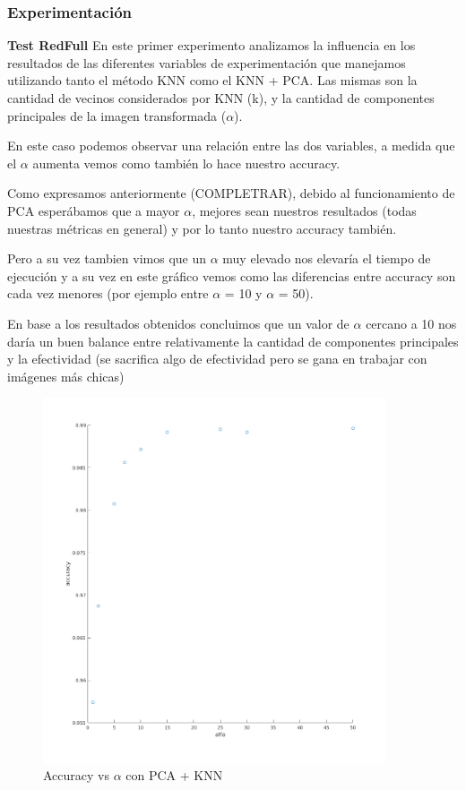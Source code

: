 \subsubsection*{Experimentación}
\textbf{Test RedFull}
En este primer experimento analizamos la influencia en los resultados de las diferentes variables de experimentación que manejamos utilizando tanto el método KNN como el KNN + PCA. Las mismas son la cantidad de vecinos considerados por KNN (k), y la cantidad de componentes principales de la imagen transformada ($\alpha$).


En este caso podemos observar una relación entre las dos variables, a medida que el $\alpha$ aumenta vemos como también lo hace nuestro accuracy.

Como expresamos anteriormente (COMPLETRAR), debido al funcionamiento de PCA esperábamos que a mayor $\alpha$, mejores sean nuestros resultados (todas nuestras métricas en general) y por lo tanto nuestro accuracy también.

Pero a su vez tambien vimos que un $\alpha$ muy elevado  nos elevaría el tiempo de ejecución y a su vez en este gráfico vemos como las diferencias entre accuracy son cada vez menores (por ejemplo entre $\alpha$ = 10 y $\alpha$ = 50).

En base a los resultados obtenidos concluimos que un valor de $\alpha$ cercano a 10 nos daría un buen balance entre relativamente la cantidad de componentes principales y la efectividad (se sacrifica algo de efectividad pero se gana en trabajar con imágenes más chicas)

\begin{figure}[H]
	\centering	\includegraphics[width=0.9\textwidth]{img/alfa_pca_accu.png}
	\caption{Accuracy vs $\alpha$ con PCA + KNN}
	\label{fig:Accuracy vs Alpha con KNN + PCA}
\end{figure}

